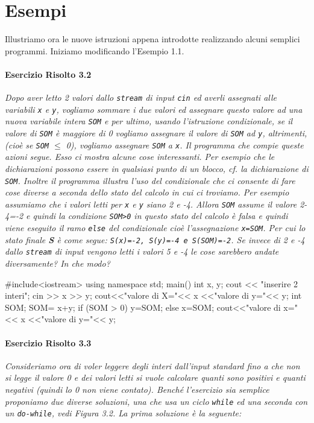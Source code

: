 \documentclass[a4paper,12pt]{book}
\begin{document}
\section{Esempi}
Illustriamo ora le nuove istruzioni appena introdotte realizzando alcuni semplici programmi. Iniziamo modificando l'Esempio 1.1.

\paragraph{Esercizio Risolto 3.2}
\textit{Dopo aver letto 2 valori dallo \texttt{stream} di input \texttt{cin} ed averli assegnati alle variabili \texttt{x} e \texttt{y}, vogliamo sommare i due valori ed assegnare questo valore ad una nuova variabile intera \texttt{SOM} e per ultimo, usando l'istruzione condizionale, se il valore di \texttt{SOM} è maggiore di 0 vogliamo assegnare il valore di \texttt{SOM} ad \texttt{y}, altrimenti, (cioè se \texttt{SOM} $\le$ 0), vogliamo assegnare \texttt{SOM} a \texttt{x}.
Il programma che compie queste azioni segue. Esso ci mostra alcune cose interessanti.
Per esempio che le dichiarazioni possono essere in qualsiasi punto di un blocco, cf. la dichiarazione di \texttt{SOM}.
Inoltre il programma illustra l'uso del condizionale che ci consente di fare cose diverse a seconda dello stato del calcolo in cui ci troviamo.
Per esempio assumiamo che i valori letti per \texttt{x} e \texttt{y} siano 2 e -4. Allora \texttt{SOM} assume il valore 2-4=-2 e quindi la condizione \texttt{SOM>0} in questo stato del calcolo è falsa e quindi viene eseguito il ramo \texttt{else} del condizionale cioè l'assegnazione \texttt{x=SOM}.
Per cui lo stato finale \textbf{S} è come segue: \texttt{S(x)=-2, S(y)=-4 e S(SOM)=-2}.
Se invece di 2 e -4 dallo \texttt{stream} di input vengono letti i valori 5 e -4 le cose sarebbero andate diversamente? In che modo?}

\begin{codice}

#include<iostream> 
using namespace std; 
main() {
  int x, y; 
  cout << "inserire 2 interi"; 
  cin >> x >> y; 
  cout<<"valore di X="<< x <<"valore di y="<< y;
  int SOM; 
  SOM= x+y; 
  if (SOM > 0) 
    y=SOM;
  else
    x=SOM;
  cout<<"valore di x="<< x <<"valore di y="<< y;
}
\end{codice}

\paragraph{Esercizio Risolto 3.3}
\textit{Consideriamo ora di voler leggere degli interi dall'input standard fino a che non si legge il valore 0 e dei valori letti si vuole calcolare quanti sono positivi e quanti negativi (quindi lo 0 non viene contato).
Benché l'esercizio sia semplice proponiamo due diverse soluzioni, una che usa un ciclo \texttt{while} ed una seconda con un \texttt{do-while}, vedi Figura 3.2.
La prima soluzione è la seguente:}
\end{document}
